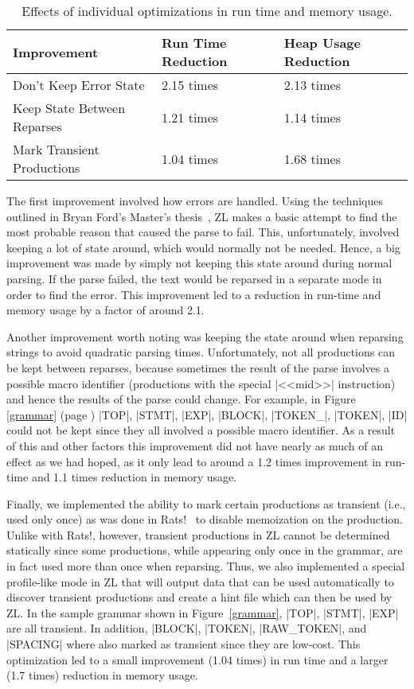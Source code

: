 \begin{table}
\UndefineShortVerb{\|}
\begin{center}
\begin{tabular}{|l|l|l|}
\hline
Improvement & Run Time Reduction & Heap Usage Reduction \\
\hline
\hline
Don't Keep Error State & 2.15 times & 2.13 times \\
\hline
Keep State Between Reparses & 1.21 times & 1.14 times \\
\hline
Mark Transient Productions & 1.04 times & 1.68 times \\
\hline
\end{tabular}
\end{center}
\DefineShortVerb{\|}
\caption{Effects of individual optimizations in run time and memory
  usage.}
\label{benchmark0}
\end{table}

The first improvement involved how errors are handled.  Using the
techniques outlined in Bryan Ford's Master's thesis~\cite{peg-thesis},
ZL makes a basic attempt to find the most probable reason that
caused the parse to fail.  This, unfortunately, involved keeping a lot
of state around, which would normally not be needed.  Hence, a big
improvement was made by simply not keeping this state around during
normal parsing.  If the parse failed, the text would be reparsed in a
separate mode in order to find the error.  This improvement led to
a reduction in run-time and memory usage by a factor of around
2.1.

Another improvement worth noting was keeping the state around when
reparsing strings to avoid quadratic parsing times.  Unfortunately,
not all productions can be kept between reparses, because sometimes the
result of the parse involves a possible macro identifier (productions
with the special |<<mid>>| instruction) and hence the results of the
parse could change.  For example, in Figure \ref{grammar} (page
\pageref{grammar}) |TOP|, |STMT|, |EXP|, |BLOCK|, |TOKEN_|, |TOKEN|,
|ID| could not be kept since they all involved a possible macro
identifier.  As a result of this and other factors this improvement
did not have nearly as much of an effect as we had hoped, as it only
lead to around a 1.2 times improvement in run-time and 1.1 times
reduction in memory usage.

Finally, we implemented the ability to mark certain productions as
transient (i.e., used only once) as was done in Rats!~\cite{peg-grimm}
to disable memoization on the production.  Unlike with Rats!,
however, transient productions in ZL cannot be determined statically
since some productions, while appearing only once in the grammar, are
in fact used more than once when reparsing.  Thus, we also implemented
a special profile-like mode in ZL that will output data that can be
used automatically to discover transient productions and create a hint
file which can then be used by ZL.  In the sample grammar shown in
Figure~\ref{grammar}, |TOP|, |STMT|, |EXP| are all transient.  In
addition, |BLOCK|, |TOKEN|, |RAW_TOKEN|, and |SPACING| where also
marked as transient since they are low-cost.  This optimization led
to a small improvement (1.04 times) in run time and a larger (1.7
times) reduction in memory usage.

